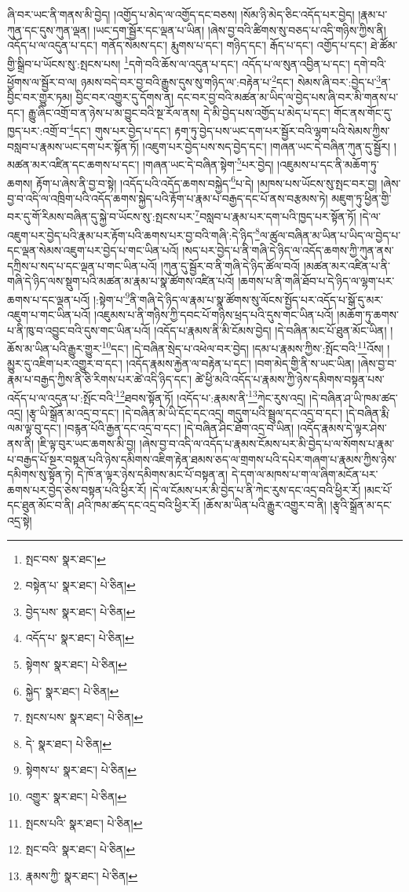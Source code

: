 ཞི་བར་ཡང་ནི་གནས་མི་བྱེད། །འགྱོད་པ་མེད་ལ་འགྱོད་དང་བཅས། །སོམ་ཉི་མེད་ཅིང་འདོད་པར་བྱེད། །རྣམ་པ་ཀུན་དང་དུས་ཀུན་ལྡན། །ཡང་དག་སྦྱོར་དང་ལྡན་པ་ཡིན། །ཞེས་བྱ་བའི་ཚིགས་སུ་བཅད་པ་འདི་གཉིས་ཀྱིས་ནི། འདོད་པ་ལ་འདུན་པ་དང་། གནོད་སེམས་དང་། རྨུགས་པ་དང་། གཉིད་དང་། རྒོད་པ་དང་། འགྱོད་པ་དང་། ཐེ་ཚོམ་གྱི་སྒྲིབ་པ་ཡོངས་སུ་:སྤངས་པས། \footnote{སྤང་བས་  སྣར་ཐང་། }དགེ་བའི་ཆོས་ལ་འདུན་པ་དང་། འདོད་པ་ལ་སུན་འབྱིན་པ་དང་། དགེ་བའི་ཕྱོགས་ལ་སྦྱོར་བ་ལ། ཉམས་བདེ་བར་བྱ་བའི་རྒྱུས་དུས་སུ་གཉིད་ལ་:བརྟེན་པ་\footnote{བསྟེན་པ་  སྣར་ཐང་།  པེ་ཅིན། }དང་། སེམས་ཞི་བར་:བྱེད་པ་\footnote{བྱེད་པས་  སྣར་ཐང་།  པེ་ཅིན། }ན་བྱིང་བར་གྱུར་ཏམ། བྱིང་བར་འགྱུར་དུ་དོགས་ན། དང་བར་བྱ་བའི་མཚན་མ་ཡིད་ལ་བྱེད་པས་ཞི་བར་མི་གནས་པ་དང་། རྒྱུ་ཞིང་འགྲོ་བ་ན་ཉེས་པ་མ་བྱུང་བའི་སྔ་རོལ་ནས། དེ་མི་བྱེད་པས་འགྱོད་པ་མེད་པ་དང་། གོང་ནས་གོང་དུ་ཁྱད་པར་:འགྲོ་བ་\footnote{འདོད་པ་  སྣར་ཐང་།  པེ་ཅིན། }དང་། གུས་པར་བྱེད་པ་དང་། རྟག་ཏུ་བྱེད་པས་ཡང་དག་པར་སྦྱོར་བའི་ལྷག་པའི་སེམས་ཀྱིས་བསླབ་པ་རྣམས་ཡང་དག་པར་སྟོན་ཏོ། །འཇུག་པར་བྱེད་པས་སད་བྱེད་དང་། །གཞན་ཡང་དེ་བཞིན་ཀུན་དུ་སྦྱོར། །མཚན་མར་འཛིན་དང་ཆགས་པ་དང་། །གཞན་ཡང་དེ་བཞིན་སྟེག་\footnote{སྟེགས་  སྣར་ཐང་།  པེ་ཅིན། }པར་བྱེད། །འཇུམས་པ་དང་ནི་མཆོག་ཏུ་ཆགས། རྟོག་པ་ཞེས་ནི་བྱ་བ་སྟེ། །འདོད་པའི་འདོད་ཆགས་བསྐྱེད་\footnote{སྐྱེད་  སྣར་ཐང་།  པེ་ཅིན། }པ་དེ། །མཁས་པས་ཡོངས་སུ་སྤང་བར་བྱ། །ཞེས་བྱ་བ་འདི་ལ་འཁྲིག་པའི་འདོད་ཆགས་སྐྱེད་པའི་རྟོག་པ་རྣམ་པ་བརྒྱད་དང་པོ་ནས་བརྩམས་ཏེ། མཇུག་ཏུ་ཕྱིན་གྱི་བར་དུ་གོ་རིམས་བཞིན་དུ་སྐྱེ་བ་ཡོངས་སུ་:སྤངས་པར་\footnote{སྤངས་པས་  སྣར་ཐང་།  པེ་ཅིན། }བསླབ་པ་རྣམ་པར་དག་པའི་ཁྱད་པར་སྟོན་ཏོ། །དེ་ལ་འཇུག་པར་བྱེད་པའི་རྣམ་པར་རྟོག་པའི་ཆགས་པར་བྱ་བའི་གཞི་:དེ་ཉིད་\footnote{དེ་  སྣར་ཐང་།  པེ་ཅིན། }ལ་ཚུལ་བཞིན་མ་ཡིན་པ་ཡིད་ལ་བྱེད་པ་དང་ལྡན་སེམས་འཇུག་པར་བྱེད་པ་གང་ཡིན་པའོ། །སད་པར་བྱེད་པ་ནི་གཞི་དེ་ཉིད་ལ་འདོད་ཆགས་ཀྱི་ཀུན་ནས་དཀྲིས་པ་སད་པ་དང་ལྡན་པ་གང་ཡིན་པའོ། །ཀུན་དུ་སྦྱོར་བ་ནི་གཞི་དེ་ཉིད་ཚོལ་བའོ། །མཚན་མར་འཛིན་པ་ནི་གཞི་དེ་ཉིད་ལས་སྡུག་པའི་མཚན་མ་རྣམ་པ་སྣ་ཚོགས་འཛིན་པའོ། །ཆགས་པ་ནི་གཞི་ཐོབ་པ་དེ་ཉིད་ལ་ལྷག་པར་ཆགས་པ་དང་ལྡན་པའོ། །:སྟེག་པ་\footnote{སྟེགས་པ་  སྣར་ཐང་།  པེ་ཅིན། }ནི་གཞི་དེ་ཉིད་ལ་རྣམ་པ་སྣ་ཚོགས་སུ་ལོངས་སྤྱོད་པར་འདོད་པ་སྒོ་དུ་མར་འཇུག་པ་གང་ཡིན་པའོ། །འཇུམས་པ་ནི་གཉིས་ཀྱི་དབང་པོ་གཉིས་ཕྲད་པའི་དུས་གང་ཡིན་པའོ། །མཆོག་ཏུ་ཆགས་པ་ནི་ཁུ་བ་འབྱུང་བའི་དུས་གང་ཡིན་པའོ། །འདོད་པ་རྣམས་ནི་མི་ངོམས་བྱེད། །དེ་བཞིན་མང་པོ་ཐུན་མོང་ཡིན། །ཆོས་མ་ཡིན་པའི་རྒྱུར་གྱུར་\footnote{འགྱུར་  སྣར་ཐང་།  པེ་ཅིན། }དང་། །དེ་བཞིན་སྲེད་པ་འཕེལ་བར་བྱེད། །དམ་པ་རྣམས་ཀྱིས་:སྤོང་བའི་\footnote{སྤངས་པའི་  སྣར་ཐང་།  པེ་ཅིན། }འོས། །མྱུར་དུ་འཇིག་པར་འགྱུར་བ་དང་། །འདོད་རྣམས་རྐྱེན་ལ་བརྟེན་པ་དང་། །བག་མེད་གྱི་ནི་ས་ཡང་ཡིན། །ཞེས་བྱ་བ་རྣམ་པ་བརྒྱད་ཀྱིས་ནི་ཅི་རིགས་པར་ཚེ་འདི་ཉིད་དང་། ཚེ་ཕྱི་མའི་འདོད་པ་རྣམས་ཀྱི་ཉེས་དམིགས་བསྟན་པས་འདོད་པ་ལ་འདུན་པ་:སྤོང་བའི་\footnote{སྤང་བའི་  སྣར་ཐང་།  པེ་ཅིན། }ཐབས་སྟོན་ཏོ། །འདོད་པ་:རྣམས་ནི་\footnote{རྣམས་ཀྱི་  སྣར་ཐང་།  པེ་ཅིན། }ཀེང་རུས་འདྲ། །དེ་བཞིན་ཤ་ཡི་ཁམ་ཚད་འདྲ། །རྩྭ་ཡི་སྒྲོན་མ་འདྲ་བ་དང་། །དེ་བཞིན་མེ་ཡི་དོང་དང་འདྲ། གདུག་པའི་སྦྲུལ་དང་འདྲ་བ་དང་། །དེ་བཞིན་རྨི་ལམ་ལྟ་བུ་དང་། །བརྙན་པོའི་རྒྱན་དང་འདྲ་བ་དང་། །དེ་བཞིན་ཤིང་ཐོག་འདྲ་བ་ཡིན། །འདོད་རྣམས་དེ་ལྟར་ཤེས་ནས་ནི། །ཇི་ལྟ་བུར་ཡང་ཆགས་མི་བྱ། །ཞེས་བྱ་བ་འདི་ལ་འདོད་པ་རྣམས་ངོམས་པར་མི་བྱེད་པ་ལ་སོགས་པ་རྣམ་པ་བརྒྱད་པོ་སྔར་བསྟན་པའི་ཉེས་དམིགས་འཇིག་རྟེན་ཐམས་ཅད་ལ་གྲགས་པའི་དཔེར་གཞག་པ་རྣམས་ཀྱིས་ཉེས་དམིགས་སུ་སྟོན་ཏེ། དེ་ཁོ་ན་ལྟར་ཉེས་དམིགས་མང་པོ་བསྟན་ན། དེ་དག་ལ་མཁས་པ་ག་ལ་ཞིག་མངོན་པར་ཆགས་པར་བྱེད་ཅེས་བསྟན་པའི་ཕྱིར་རོ། །དེ་ལ་ངོམས་པར་མི་བྱེད་པ་ནི་ཀེང་རུས་དང་འདྲ་བའི་ཕྱིར་རོ། །མང་པོ་དང་ཐུན་མོང་བ་ནི། ཤའི་ཁམ་ཚད་དང་འདྲ་བའི་ཕྱིར་རོ། །ཆོས་མ་ཡིན་པའི་རྒྱུར་འགྱུར་བ་ནི། །རྩྭའི་སྒྲོན་མ་དང་འདྲ་སྟེ། 